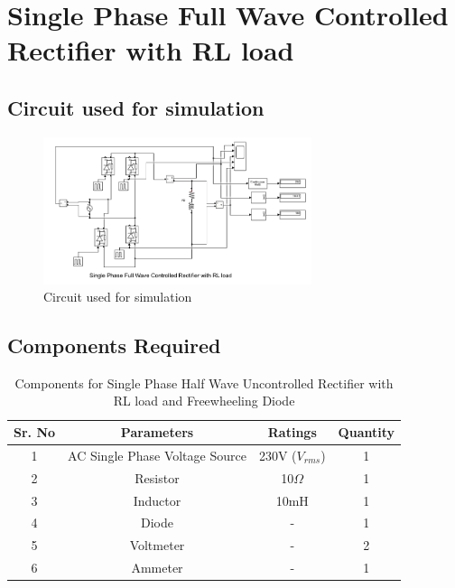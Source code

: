 \section{Single Phase Full Wave Controlled Rectifier with RL load}

\subsection{Circuit used for simulation}

\begin{figure}[h]
    \centering
    \includegraphics[width=0.7\textwidth]{images/experiment-2/circuit-diagram-simulation-03.png}
    \caption{Circuit used for simulation}
    \label{Fig_simulation_circuit_single-phase-full-wave-controlled-rectifier-with-RL-load}
\end{figure}

\subsection{Components Required}

\begin{table}[h]
    \renewcommand{\arraystretch}{1.3}
    \label{table_components_required_circuit_3}
    \centering
    \begin{tabular}{|c|c|c|c|}
        \hline
        Sr. No & Parameters                     & Ratings            & Quantity \\
        \hline
        \hline
        1      & AC Single Phase Voltage Source & 230V ($ V_{rms} $) & 1        \\
        \hline
        2      & Resistor                       & 10$ \Omega $       & 1        \\
        \hline
        3      & Inductor                       & 10mH               & 1        \\
        \hline
        4      & Diode                          & -                  & 1        \\
        \hline
        5      & Voltmeter                      & -                  & 2        \\
        \hline
        6      & Ammeter                        & -                  & 1        \\
        \hline
    \end{tabular}
    \caption{Components for Single Phase Half Wave Uncontrolled Rectifier with RL load and Freewheeling Diode}
\end{table}


